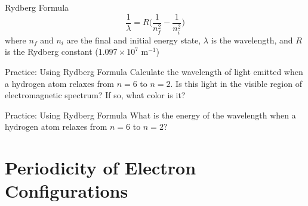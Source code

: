 \documentclass[11pt]{beamer}
\begin{document}
\begin{frame}{Rydberg Formula}
  \begin{equation}
    \frac{1}{\lambda} = R\Bigg(\frac{1}{n_f^2} - \frac{1}{n_i^2}\Bigg)
  \end{equation}
  where $n_f$ and $n_i$ are the final and initial energy state,
  $\lambda$ is the wavelength, and $R$ is the Rydberg constant
  ($1.097\times 10^7$ m$^{-1}$)
\end{frame}

\begin{frame}{Practice: Using Rydberg Formula}
  Calculate the wavelength of light emitted when a hydrogen atom relaxes
  from $n = 6$ to $n = 2$. Is this light in the visible region of
  electromagnetic spectrum? If so, what color is it?
  \vfill
\end{frame}

\begin{frame}{Practice: Using Rydberg Formula}
  What is the energy of the wavelength when a hydrogen atom relaxes
  from $n = 6$ to $n = 2$?
  \vfill
\end{frame}

\section{Periodicity of Electron Configurations}
\end{document}
